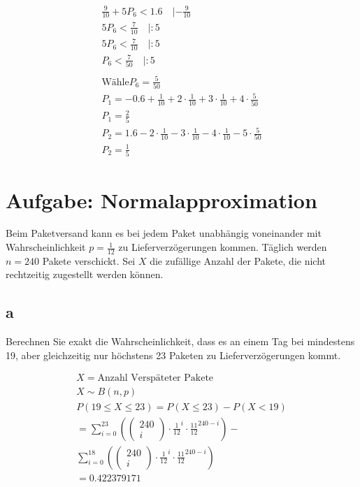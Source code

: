 \begin{align*}
    \frac{9}{10} + 5P_6 < 1.6 \quad | -\frac{9}{10}                                                       \\
    5P_6 < \frac{7}{10} \quad | : 5                                                                       \\
    5P_6 < \frac{7}{10} \quad | : 5                                                                       \\
    P_6 < \frac{7}{50} \quad | : 5                                                                        \\\\
    \text{Wähle} P_6 = \frac{5}{50}                                                                       \\
    P_1 = -0.6 + \frac{1}{10} + 2 \cdot \frac{1}{10} + 3 \cdot \frac{1}{10} + 4 \cdot \frac{5}{50}        \\
    P_1 = \frac{2}{5}                                                                                     \\
    P_2 = 1.6 - 2 \cdot \frac{1}{10} - 3 \cdot \frac{1}{10} - 4 \cdot \frac{1}{10} - 5 \cdot \frac{5}{50} \\
    P_2 = \frac{1}{5}
\end{align*}

\section{Aufgabe: Normalapproximation}

Beim Paketversand kann es bei jedem Paket unabhängig voneinander mit Wahrscheinlichkeit $p=\frac{1}{12}$ zu Lieferverzögerungen kommen. Täglich werden $n=240$ Pakete verschickt. Sei $X$ die zufällige Anzahl der Pakete, die nicht rechtzeitig zugestellt werden können. 

\subsection{a}

Berechnen Sie exakt die Wahrscheinlichkeit, dass es an einem Tag bei mindestens 19, aber gleichzeitig nur höchstens 23 Paketen zu Lieferverzögerungen kommt.

\begin{align*}
    X = \text{Anzahl Verspäteter Pakete} \\
    X \sim B(n, p) \\
    P(19 \leq X \leq 23) = P(X \leq 23) - P(X < 19) \\
    = \sum_{i = 0}^{23}\left(\begin{pmatrix}
        240 \\ i
    \end{pmatrix} \cdot \frac{1}{12}^i \cdot \frac{11}{12}^{240 - i}\right) - \\
    \sum_{i = 0}^{18}\left(\begin{pmatrix}
        240 \\ i
    \end{pmatrix} \cdot \frac{1}{12}^i \cdot \frac{11}{12}^{240 - i}\right) \\
    = 0.422379171
\end{align*}

